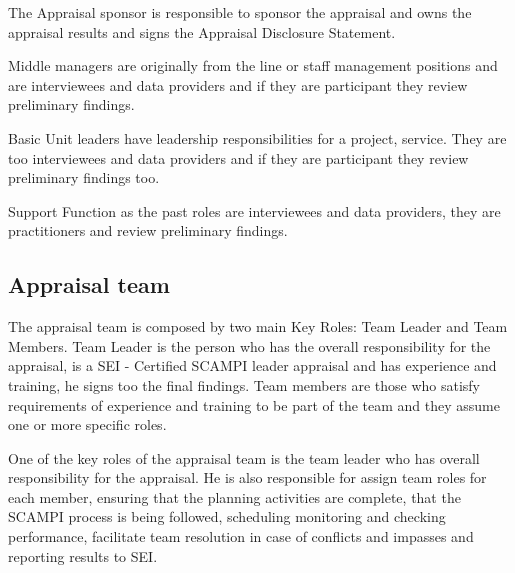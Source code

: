 The Appraisal sponsor is responsible to sponsor the appraisal and owns the appraisal results and signs the Appraisal Disclosure Statement.

Middle managers are originally from the line or staff management positions and are interviewees and data providers and if they are participant they review preliminary findings.

Basic Unit leaders have leadership responsibilities for a project, service. They are too interviewees and data providers and if they are participant they review preliminary findings too.

Support Function as the past roles are interviewees and data providers, they are practitioners and review preliminary findings.

\subsection{Appraisal team}

The appraisal team is composed by two main Key Roles: Team Leader and Team Members.
Team Leader is the person who has the overall responsibility for the appraisal, is a SEI - Certified SCAMPI\citep{SCAMPITeam2013} leader appraisal and has experience and training, he signs too the final findings.
Team members are those who satisfy requirements of  experience and training to be part of the team and they assume one or more specific roles.

One of the key roles of the appraisal team is the team leader who has overall responsibility for the appraisal. He is also responsible for assign team roles for each member, ensuring that the planning activities are complete, that the SCAMPI process is being followed, scheduling monitoring and checking performance, facilitate team resolution in case of conflicts and impasses and reporting results to SEI.

